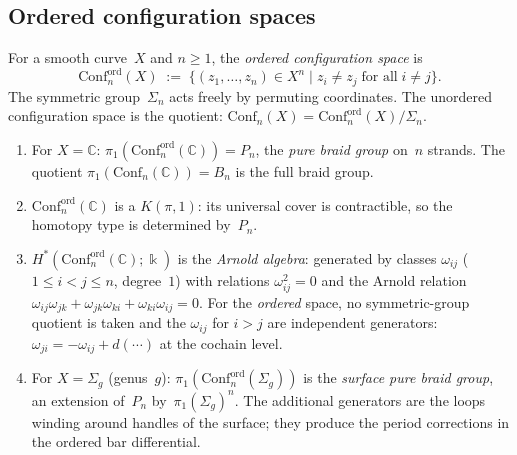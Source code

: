 \subsection{Ordered configuration spaces}

\begin{definition}
For a smooth curve~$X$ and $n\ge 1$, the \emph{ordered
configuration space} is
\[
\mathrm{Conf}_n^{\mathrm{ord}}(X)
\;:=\;
\bigl\{(z_1,\dots,z_n)\in X^n
\;\big|\;
z_i\neq z_j\;\text{for all}\;i\neq j\bigr\}.
\]
The symmetric group~$\Sigma_n$ acts freely by permuting
coordinates. The unordered configuration space is the
quotient:
$\mathrm{Conf}_n(X)
=\mathrm{Conf}_n^{\mathrm{ord}}(X)/\Sigma_n$.
\end{definition}

\begin{proposition}
\begin{enumerate}[label=\textup{(\roman*)}]
\item For $X=\mathbb C$:
 $\pi_1(\mathrm{Conf}_n^{\mathrm{ord}}(\mathbb C))
 =P_n$, the \emph{pure braid group} on~$n$ strands.
 The quotient
 $\pi_1(\mathrm{Conf}_n(\mathbb C))=B_n$
 is the full braid group.
\item $\mathrm{Conf}_n^{\mathrm{ord}}(\mathbb C)$ is a
 $K(\pi,1)$: its universal cover is contractible, so the
 homotopy type is determined by~$P_n$.
\item $H^*(\mathrm{Conf}_n^{\mathrm{ord}}(\mathbb C);\Bbbk)$
 is the \emph{Arnold algebra}: generated by classes
 $\omega_{ij}$ ($1\le i<j\le n$, degree~$1$) with relations
 $\omega_{ij}^2=0$ and the Arnold relation
 $\omega_{ij}\omega_{jk}+\omega_{jk}\omega_{ki}
 +\omega_{ki}\omega_{ij}=0$.
 For the \emph{ordered} space, no symmetric-group quotient
 is taken and the $\omega_{ij}$ for $i>j$ are independent
 generators: $\omega_{ji}=-\omega_{ij}+d(\cdots)$ at the
 cochain level.
\item For $X=\Sigma_g$ (genus~$g$):
 $\pi_1(\mathrm{Conf}_n^{\mathrm{ord}}(\Sigma_g))$
 is the \emph{surface pure braid group}, an extension
 of~$P_n$ by~$\pi_1(\Sigma_g)^n$. The additional
 generators are the loops winding around handles of the
 surface; they produce the period corrections in the
 ordered bar differential.
\end{enumerate}
\end{proposition}

